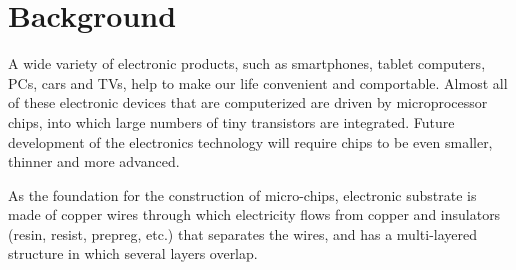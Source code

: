 \documentclass[10pt,twocolumn,letterpaper]{article}
\begin{document}
\section{Background}




A wide variety of electronic products, such as smartphones, tablet computers, PCs, cars and TVs, help to make our life convenient and comportable.
Almost all of these electronic devices that are computerized are driven by microprocessor chips, into which large numbers of tiny transistors are integrated.
Future development of the electronics technology will require chips to be even smaller, thinner and more advanced.

As the foundation for the construction of micro-chips, electronic substrate is made of copper wires through which electricity flows from copper and insulators (resin, resist, prepreg, etc.) that separates the wires, and has a multi-layered structure in which several layers overlap.
\end{document}

